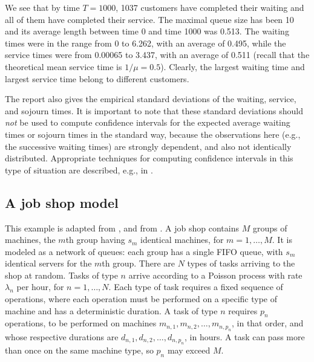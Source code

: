 We see that by time $T =1000$, 1037 customers have completed their waiting
and all of them have completed their service.
The maximal queue size has been 10 and its average length
between time 0 and time 1000 was 0.513.
The waiting times were in the range from 0 to 6.262, with an average of 0.495,
while the service times were from 0.00065 to 3.437, with an average of 0.511
(recall that the theoretical mean service time is $1/\mu = 0.5$).
Clearly, the largest waiting time and largest service time
belong to different customers.

The report also gives the empirical standard deviations of the waiting,
service, and sojourn times.  It is important to note that these
standard deviations should {\em not\/} be used to compute confidence
intervals for the expected average waiting times or sojourn times
in the standard way, because the observations here (e.g., the successive
waiting times) are strongly dependent, and also not identically distributed.
Appropriate techniques for computing confidence intervals in this type of
situation are described, e.g., in \cite{sFIS96a,sLAW00a}.


\subsection {A job shop model}
\label {sec:jobshop}

This example is adapted from \cite[Section 2.6]{sLAW00a},
and from \cite{sLEC88a}.
A job shop contains $M$ groups of machines, the $m$th group having
$s_m$ identical machines, for $m=1,\dots,M$.
It is modeled as a network of queues:
each group has a single FIFO queue, with $s_m$ identical servers for the
$m$th group.  There are $N$ types of tasks arriving to the shop
at random.  Tasks of type $n$ arrive according to a Poisson process
with rate $\lambda_n$ per hour, for $n=1,\dots,N$.
Each type of task requires a fixed sequence of operations,
where each operation must be performed on a specific type of machine
and has a deterministic duration.
A task of type $n$ requires $p_n$ operations, to be performed on
machines $m_{n,1},m_{n,2},\dots,m_{n,p_n}$, in that order, and whose
respective durations are $d_{n,1},d_{n,2},\dots,d_{n,p_n}$, in hours.
A task can pass more than once on the same machine type, so $p_n$ may
exceed $M$.

